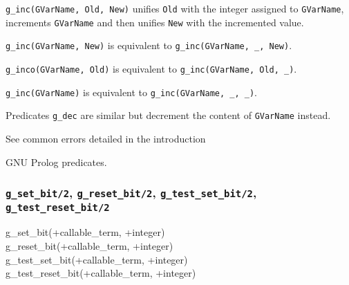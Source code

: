 \Description

\texttt{g\_inc(GVarName, Old, New)} unifies \texttt{Old} with the
integer assigned to \texttt{GVarName}, increments \texttt{GVarName} and
then unifies \texttt{New} with the incremented value.

\texttt{g\_inc(GVarName, New)} is equivalent to 
\texttt{g\_inc(GVarName, \_, New)}.

\texttt{g\_inco(GVarName, Old)} is equivalent to 
\texttt{g\_inc(GVarName, Old, \_)}.

\texttt{g\_inc(GVarName)} is equivalent to \texttt{g\_inc(GVarName, \_, \_)}.

Predicates \texttt{g\_dec} are similar but decrement the content of
\texttt{GVarName} instead.

\Errors

See common errors detailed in the introduction 

\begin{PlErrorsNoTitle}





\end{PlErrorsNoTitle}

\Portability

GNU Prolog predicates.

\subsubsection{\texttt{g\_set\_bit/2},
               \texttt{g\_reset\_bit/2},
               \texttt{g\_test\_set\_bit/2},
               \texttt{g\_test\_reset\_bit/2}}


\begin{TemplatesOneCol}
g\_set\_bit(+callable\_term, +integer) \\
g\_reset\_bit(+callable\_term, +integer) \\
g\_test\_set\_bit(+callable\_term, +integer) \\
g\_test\_reset\_bit(+callable\_term, +integer)

\end{TemplatesOneCol}

